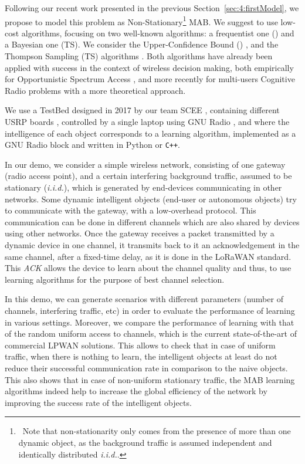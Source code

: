 Following our recent work presented in the previous Section~\ref{sec:4:firstModel}, we propose to model this problem as Non-Stationary\footnote{~Note that non-stationarity only comes from the presence of more than one dynamic object, as the background traffic is assumed independent and identically distributed \emph{i.i.d.}.} MAB.
We suggest to use low-cost algorithms, focusing on two well-known algorithms: a frequentist one (\UCB{}) and a Bayesian one (TS).
We consider the Upper-Confidence Bound (\UCB{}) \cite{Auer}, and the Thompson Sampling (TS) algorithms \cite{Thompson33}. Both algorithms have already been applied with success in the context of wireless decision making, both empirically for Opportunistic Spectrum Access \cite{Jouini},
and more recently for multi-users Cognitive Radio problems \cite{BessonALT18} with a more theoretical approach.

We use a TestBed designed in 2017 by our team SCEE \cite{Bodinier17}, containing different USRP boards \cite{USRPDocumentation}, controlled by a single laptop using GNU Radio \cite{GNURadioDocumentation},
and where the intelligence of each object corresponds to a learning algorithm, implemented as a GNU Radio block \cite{GNURadioCompanionDocumentation} and written in Python or \texttt{C++}.

In our demo, we consider a simple wireless network, consisting of one gateway (radio access point), and a certain interfering background traffic, assumed to be stationary (\emph{i.i.d.}), which is generated by end-devices communicating in other networks.
Some dynamic intelligent objects (end-user or autonomous objects) try to communicate with the gateway, with a low-overhead protocol. This communication can be done in different channels which are also shared by devices using other networks.
Once the gateway receives a packet transmitted by a dynamic device in one channel, it transmits back to it an acknowledgement in the same channel, after a fixed-time delay, as it is done in the LoRaWAN standard.
This \emph{ACK} allows the device to learn about the channel quality and thus, to use learning algorithms for the purpose of best channel selection.

In this demo, we can generate scenarios with different parameters (number of channels, interfering traffic, etc) in order to evaluate the performance of learning in various settings.
Moreover, we compare the performance of learning with that of the random uniform access to channels, which is the current state-of-the-art of commercial LPWAN solutions.
%
This allows to check that in case of uniform traffic, when there is nothing to learn, the intelligent objects at least do not reduce their successful communication rate in comparison to the naive objects.
This also shows that in case of non-uniform stationary traffic, the MAB learning algorithms indeed help to increase the global efficiency of the network by improving the success rate of the intelligent objects.

